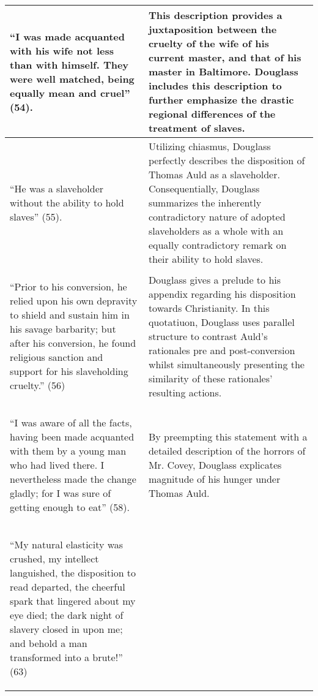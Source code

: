 \documentclass[12pt]{article}
\begin{document}
\begin{longtable}{| p{} | p{} |}
  \hline
    \begin{center}
      ``I was made acquanted with his wife not less than with himself. They were well matched, being equally mean and cruel'' (54).
    \end{center} & This description provides a juxtaposition between the cruelty of the wife of his current master, and that of his master in Baltimore. Douglass includes this description to further emphasize the drastic regional differences of the treatment of slaves.   \\
  \hline
    \begin{center}
      ``He was a slaveholder without the ability to hold slaves'' (55).
    \end{center} & Utilizing chiasmus, Douglass perfectly describes the disposition of Thomas Auld as a slaveholder. Consequentially, Douglass summarizes the inherently contradictory nature of adopted slaveholders as a whole with an equally contradictory remark on their ability to hold slaves.    \\
  \hline
    \begin{center}
      ``Prior to his conversion, he relied upon his own depravity to shield and sustain him in his savage barbarity; but after his conversion, he found religious sanction and support for his slaveholding cruelty.'' (56)
    \end{center} & Douglass gives a prelude to his appendix regarding his disposition towards Christianity. In this quotatiuon, Douglass uses parallel structure to  contrast Auld's rationales pre and post-conversion whilst simultaneously presenting the similarity of these rationales' resulting actions.  \\
  \hline
    \begin{center}
      ``I was aware of all the facts, having been made acquanted with them by a young man who had lived there. I nevertheless made the change gladly; for I was sure of getting enough to eat'' (58).
    \end{center} & By preempting this statement with a detailed description of the horrors of Mr. Covey, Douglass explicates magnitude of his hunger under Thomas Auld.   \\
  \hline
    \begin{center}
      ``My natural elasticity was crushed, my intellect languished, the disposition to read departed, the cheerful spark that lingered about my eye died; the dark night of slavery closed in upon me; and behold a man transformed into a brute!'' (63)

\end{center}
\end{longtable}
\end{document}

